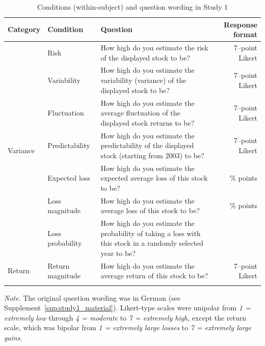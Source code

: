 \documentclass[a4paper,man, natbib,floatsintext]{apa6} %
\begin{document}
\begin{table}[hb!]
\centering
\onehalfspacing
\begin{threeparttable}
\caption{Conditions (within-subject) and question wording in Study 1}
\small
\label{table:Questions}
\begin{tabularx}{\columnwidth}{p{1.7cm}p{2.9cm}p{7cm}r{0.5cm}}
Category & Condition & Question & Response format \\
\toprule
\multirow{7}{*}{Variance} & Risk & How high do you estimate the risk of the displayed stock to be? & 7--point Likert \\
& Variability & How high do you estimate the variability (variance) of the displayed stock to be? & 7--point Likert \\
&  Fluctuation & How high do you estimate the average fluctuation of the displayed stock returns to be? & 7--point Likert \\ 
 & Predictability & How high do you estimate the predictability of the displayed stock (starting from 2003) to be? & 7--point Likert \\
 \cmidrule{2-4}
\multirow{7}{*}{Loss} & Expected loss & How high do you estimate the expected average loss of this stock to be? &  $\%$ points \\
     & Loss magnitude & How high do you estimate the average loss of this stock to be? & $\%$ points\\
     & Loss probability & How high do you estimate the probability of taking a loss with this stock in a randomly selected year to be?\\
 \cmidrule{2-4}
\multirow{1}{*}{Return} & Return magnitude & How high do you estimate the average return of this stock to be? & 7--point Likert \\
\bottomrule
\\
\end{tabularx}
\begin{tablenotes}
\small
\item
 \textit{Note}. The original question wording was in German (see Supplement~\ref{sup:study1_material}). Likert-type scales were unipolar from \textit{1 = extremely low} through \textit{4 = moderate} to \textit{7 = extremely high}, except the return scale, which was bipolar from \textit{1 = extremely large losses} to \textit{7 = extremely large gains}.

\end{tablenotes}
\end{threeparttable}
\end{table}
\end{document}

